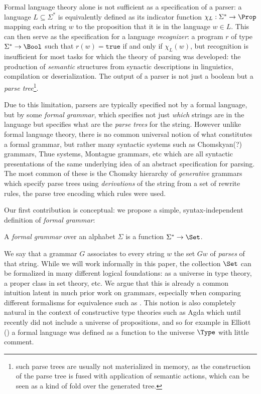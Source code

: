 \documentclass[acmsmall,anonymous,review,screen]{acmart}
\begin{document}
Formal language theory alone is not sufficient as a specification of a
parser: a language $L \subseteq \Sigma^*$ is equivalently defined as
its indicator function $\chi_L : \Sigma^* \to \Prop$ mapping each
string $w$ to the proposition that it is in the language $w \in
L$. This can then serve as the specification for a language
\emph{recognizer}: a program $r$ of type $\Sigma^* \to \Bool$ such
that $r(w) = \texttt{true}$ if and only if $\chi_L(w)$, but
recognition is insufficient for most tasks for which the theory of
parsing was developed: the production of \emph{semantic} structures
from synactic descriptions in linguistics, compilation or
deserialization. The output of a parser is not just a boolean but a
\emph{parse tree}\footnote{such parse trees are usually not
materialized in memory, as the construction of the parse tree is fused
with application of semantic actions, which can be seen as a kind of
fold over the generated tree.}.

Due to this limitation, parsers are typically specified not by a
formal language, but by some \emph{formal grammar}, which specifies
not just \emph{which} strings are in the language but specifies what
are the \emph{parse trees} for the string. However unlike formal
language theory, there is no common universal notion of what
constitutes a formal grammar, but rather many syntactic systems such
as Chomskyan(?)  grammars, Thue systems, Montague grammars, etc which
are all syntactic presentations of the same underlying idea of an
abstract specification for parsing. The most common of these is the
Chomsky hierarchy of \emph{generative} grammars which specify parse
trees using \emph{derivations} of the string from a set of rewrite
rules, the parse tree encoding which rules were used.

Our first contribution is conceptual: we propose a simple,
syntax-independent definition of \emph{formal grammar}:
\begin{definition}
  A \emph{formal grammar} over an alphabet $\Sigma$ is a function
  $\Sigma^* \to \Set$.
\end{definition}
We say that a grammar $G$ associates to every string $w$ the set $Gw$
of \emph{parses} of that string. While we will work informally in this
paper, the collection $\Set$ can be formalized in many different
logical foundations: as a universe in type theory, a proper class in
set theory, etc. We argue that this is already a common intuition
latent in much prior work on grammars, especially when comparing
different formalisms for equivalence such as \cite{??}. This notion is
also completely natural in the context of constructive type theories
such as Agda which until recently did not include a universe of
propositions, and so for example in Elliott (\cite{??}) a formal
language was defined as a function to the universe $\Type$ with little
comment.
\end{document}
